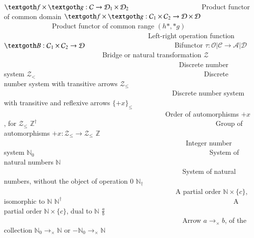 \documentclass [12pt]{book}
\begin{document}
$\textgoth f\times\textgoth g:\mathcal C\rightarrow\mathcal D_1\times\mathcal D_2$~~~~~~~~~~~~~~~~~~~~~Product functor of common domain\newline
$\textgoth f\times\textgoth g:\mathcal C_1\times\mathcal C_2\rightarrow\mathcal D\times\mathcal D$~~~~~~~~~~~~~~Product functor of common range\newline
$(h*,*g)$~~~~~~~~~~~~~~~~~~~~~~~~~~~~~~~~~~~~~~~~~~Left-right operation function\newline
$\textgoth B:\mathcal C_1\times\mathcal C_2\rightarrow\mathcal D$~~~~~~~~~~~~~~~~~~~~~~~~~~Bifunctor\newline
$\tau:\mathcal{O|C}\rightarrow\mathcal{A|D}$~~~~~~~~~~~~~~~~~~~~~~~~~~~~ Bridge or natural transformation\newline
$\mathcal Z$~~~~~~~~~~~~~~~~~~~~~~~~~~~~~~~~~~~~~~~~~~~~~~~~~~~Discrete number system\newline
$\mathcal Z_<$~~~~~~~~~~~~~~~~~~~~~~~~~~~~~~~~~~~~~~~~~~~~~~~~~Discrete number system with transitive arrows\newline
$\mathcal Z_{\leq}$~~~~~~~~~~~~~~~~~~~~~~~~~~~~~~~~~~~~~~~~~~~~~~~~~Discrete number system with transitive and reflexive arrows\newline
$\{+x\}_\leq$~~~~~~~~~~~~~~~~~~~~~~~~~~~~~~~~~~~~~~~~~~~~~~~Order of automorphisms $+x$, for $\mathcal Z_\leq$\newline
$\mathbb Z^\dagger$~~~~~~~~~~~~~~~~~~~~~~~~~~~~~~~~~~~~~~~~~~~~~~~~~~~~Group of automorphisms $+x:\mathcal Z_\leq\rightarrow\mathcal  Z_\leq$\newline
$\mathbb Z$~~~~~~~~~~~~~~~~~~~~~~~~~~~~~~~~~~~~~~~~~~~~~~~~~~~~~Integer number system\newline
$\mathbb N_0$~~~~~~~~~~~~~~~~~~~~~~~~~~~~~~~~~~~~~~~~~~~~~~~~~~~System of natural numbers\newline
$\mathbb N$~~~~~~~~~~~~~~~~~~~~~~~~~~~~~~~~~~~~~~~~~~~~~~~~~~~~System of natural numbers, without the object of operation $0$\newline
$\mathbb N_\dagger$~~~~~~~~~~~~~~~~~~~~~~~~~~~~~~~~~~~~~~~~~~~~~~~~~~A partial order $\mathbb N\times\{c\}$, isomorphic to $\mathbb N$\newline
$\mathbb N^\dagger$~~~~~~~~~~~~~~~~~~~~~~~~~~~~~~~~~~~~~~~~~~~~~~~~~~A partial order $\mathbb N\times\{c\}$, dual to $\mathbb N$\newline
$\frac{a}{b}$~~~~~~~~~~~~~~~~~~~~~~~~~~~~~~~~~~~~~~~~~~~~~~~~~~~~Arrow $a\rightarrow_\times b$, of the collection $\mathbb N_0\rightarrow_\times\mathbb N$ or $-\mathbb N_0\rightarrow_\times\mathbb N$\newline
\end{document}
